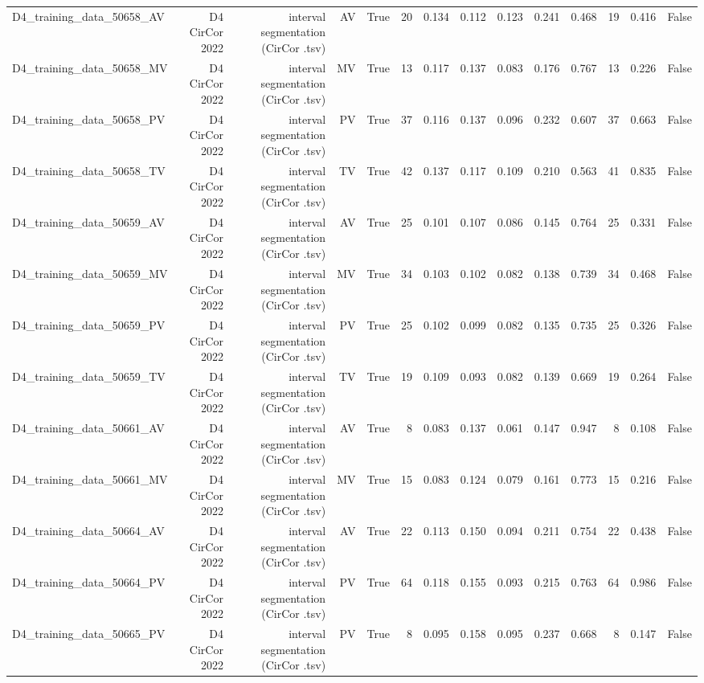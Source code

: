 \begin{table}[htbp]
\begin{tabular}{lrrrrrrrrrrrrr}
    D4\_training\_data\_50658\_AV & D4 CirCor 2022 & interval segmentation (CirCor .tsv) & AV & True & 20 & 0.134 & 0.112 & 0.123 & 0.241 & 0.468 & 19 & 0.416 & False \\
    D4\_training\_data\_50658\_MV & D4 CirCor 2022 & interval segmentation (CirCor .tsv) & MV & True & 13 & 0.117 & 0.137 & 0.083 & 0.176 & 0.767 & 13 & 0.226 & False \\
    D4\_training\_data\_50658\_PV & D4 CirCor 2022 & interval segmentation (CirCor .tsv) & PV & True & 37 & 0.116 & 0.137 & 0.096 & 0.232 & 0.607 & 37 & 0.663 & False \\
    D4\_training\_data\_50658\_TV & D4 CirCor 2022 & interval segmentation (CirCor .tsv) & TV & True & 42 & 0.137 & 0.117 & 0.109 & 0.210 & 0.563 & 41 & 0.835 & False \\
    D4\_training\_data\_50659\_AV & D4 CirCor 2022 & interval segmentation (CirCor .tsv) & AV & True & 25 & 0.101 & 0.107 & 0.086 & 0.145 & 0.764 & 25 & 0.331 & False \\
    D4\_training\_data\_50659\_MV & D4 CirCor 2022 & interval segmentation (CirCor .tsv) & MV & True & 34 & 0.103 & 0.102 & 0.082 & 0.138 & 0.739 & 34 & 0.468 & False \\
    D4\_training\_data\_50659\_PV & D4 CirCor 2022 & interval segmentation (CirCor .tsv) & PV & True & 25 & 0.102 & 0.099 & 0.082 & 0.135 & 0.735 & 25 & 0.326 & False \\
    D4\_training\_data\_50659\_TV & D4 CirCor 2022 & interval segmentation (CirCor .tsv) & TV & True & 19 & 0.109 & 0.093 & 0.082 & 0.139 & 0.669 & 19 & 0.264 & False \\
    D4\_training\_data\_50661\_AV & D4 CirCor 2022 & interval segmentation (CirCor .tsv) & AV & True & 8 & 0.083 & 0.137 & 0.061 & 0.147 & 0.947 & 8 & 0.108 & False \\
    D4\_training\_data\_50661\_MV & D4 CirCor 2022 & interval segmentation (CirCor .tsv) & MV & True & 15 & 0.083 & 0.124 & 0.079 & 0.161 & 0.773 & 15 & 0.216 & False \\
    D4\_training\_data\_50664\_AV & D4 CirCor 2022 & interval segmentation (CirCor .tsv) & AV & True & 22 & 0.113 & 0.150 & 0.094 & 0.211 & 0.754 & 22 & 0.438 & False \\
    D4\_training\_data\_50664\_PV & D4 CirCor 2022 & interval segmentation (CirCor .tsv) & PV & True & 64 & 0.118 & 0.155 & 0.093 & 0.215 & 0.763 & 64 & 0.986 & False \\
    D4\_training\_data\_50665\_PV & D4 CirCor 2022 & interval segmentation (CirCor .tsv) & PV & True & 8 & 0.095 & 0.158 & 0.095 & 0.237 & 0.668 & 8 & 0.147 & False \\

\end{tabular}
\end{table}
